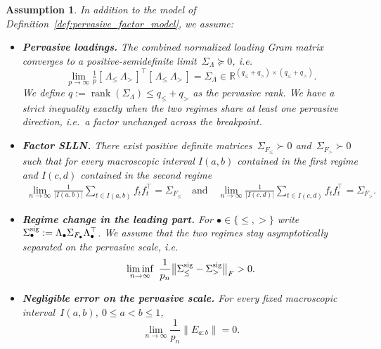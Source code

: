 \documentclass[10pt, letterpaper]{amsart}
\newtheorem{assumption}[theorem]{Assumption}
\begin{document}
\begin{assumption}\label{ass:assumptions_factor}
In addition to the model of Definition~\ref{def:pervasive_factor_model}, we assume:
\begin{itemize}
\item[(F1)] {\bf Pervasive loadings.}
   The combined normalized loading Gram matrix converges to a positive-semidefinite limit~$\Sigma_\Lambda \succeq 0$, i.e.
   \[
   \lim_{p \to \infty}\tfrac1p[\,\Lambda_{\le}\ \Lambda_{>}\,]^{\top}[\,\Lambda_{\le}\ \Lambda_{>}\,] = \Sigma_\Lambda \in \mathbb{R}^{(q_\le+q_>) \times (q_\le+q_>)}.
   \]
We define $q:=\operatorname{rank}(\Sigma_\Lambda) \leq q_\le+q_>$ as the pervasive rank. We have a strict inequality  exactly when the two regimes share at least one pervasive direction, i.e.\ a factor unchanged across the breakpoint.

\item[(F2)] {\bf Factor SLLN.}
   There exist positive definite matrices~$\Sigma_{F_{\le}} \succ 0$ and~$\Sigma_{F_{>}} \succ 0$ such that for every macroscopic interval $I(a,b)$ contained in the first regime and $I(c,d)$ contained in the second regime 
   \begin{align}
     \lim_{n \to \infty} \tfrac1{|I(a,b)|}\sum_{t\in I(a,b)} f_tf_t^{\top} = \Sigma_{F_{\le}} \quad \mbox{and} \quad   \lim_{n \to \infty} \tfrac1{|I(c,d)|}\sum_{t\in I(c,d)} f_tf_t^{\top} = \Sigma_{F_{>}}.
   \end{align}

\item[(F3)] {\bf Regime change in the leading part.}
  For $\bullet\in\{\le,>\}$ write $\Sigma_\bullet^{\rm sig}:=\Lambda_\bullet\Sigma_{F_\bullet}\Lambda_\bullet^{\top}$. We assume that the two regimes stay asymptotically separated on the pervasive scale, i.e.~
  \begin{align}\label{equ:regime_separation}
   \liminf_{n\to\infty}\ \frac{1}{p_n}\bigl\| \Sigma_\le^{\rm sig}-\Sigma_>^{\rm sig} \bigr\|_F>0 .
  \end{align}
  

\item[(F4)] {\bf Negligible error on the pervasive scale.}
   For every fixed macroscopic interval~$I(a,b)$, $ 0 \leq a < b \leq 1$, 
   \[
   \lim_{n \to \infty} \frac{1}{p_n} \bigl\| E_{a:b}\bigr\| = 0.
   \]
\end{itemize}
\end{assumption}
\end{document}
